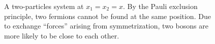 \documentclass[11pt]{article}
\begin{document}
\begin{figure}[H] %
    \centering
    \caption{A two-particles system at $x_1 = x_2 = x$. By the Pauli exclusion principle, two fermions cannot be found at the same position. Due to exchange ``forces'' arising from symmetrization, two bosons are more likely to be close to each other.}
    \label{fig:fig1}
\end{figure}




\end{document}
